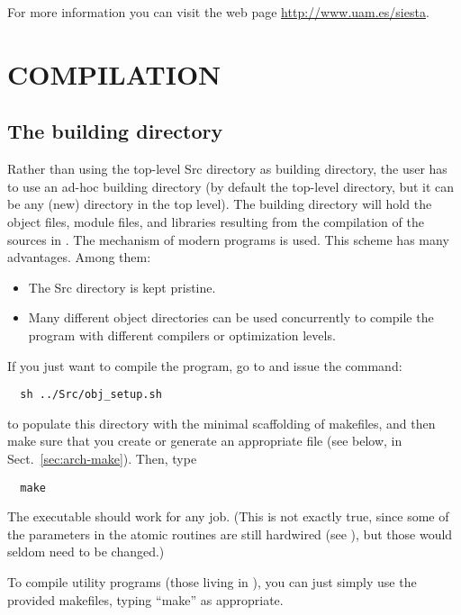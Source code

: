 For more information you can visit the web page
\url{http://www.uam.es/siesta}.

\section{COMPILATION}

\subsection{The building directory}

Rather than using the top-level Src directory as building directory,
the user has to use an ad-hoc building directory (by default the
top-level  directory, but it can be any (new) directory in
the top level).  The building directory will hold the object files,
module files, and libraries resulting from the compilation of the
sources in .  The  mechanism of modern 
programs is used. This scheme has many advantages. Among them:

\begin{itemize}
\item The Src directory is kept pristine.
\item Many different object directories can be used concurrently to
  compile the program with different compilers or optimization levels.
\end{itemize}

If you just want to compile the program, go to  and issue the
command:

\begin{verbatim}
  sh ../Src/obj_setup.sh
\end{verbatim}

to populate this directory with the minimal scaffolding of makefiles,
and then make sure that you create or generate an appropriate 
file (see below, in Sect.~\ref{sec:arch-make}). Then, type

\begin{verbatim}
  make
\end{verbatim}

The executable should work for any job. (This is not exactly true,
since some of the parameters in the atomic routines are still
hardwired (see ), but those would seldom need to
be changed.)

To compile utility programs (those living in ), you can just
simply use the provided makefiles, typing ``make'' as appropriate.

